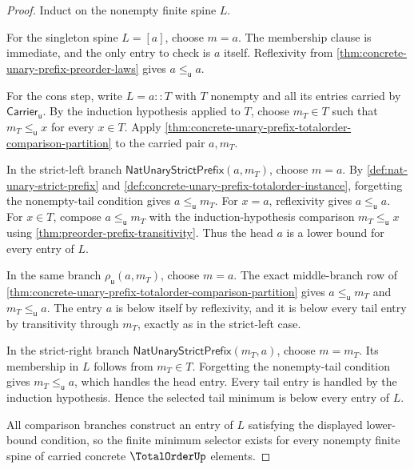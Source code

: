 \begin{proof}
Induct on the nonempty finite spine $L$.

For the singleton spine $L=[a]$, choose $m=a$. The membership clause is
immediate, and the only entry to check is $a$ itself. Reflexivity from
\autoref{thm:concrete-unary-prefix-preorder-laws} gives $a\le_{\mathsf{u}}a$.

For the cons step, write $L=a::T$ with $T$ nonempty and all its entries carried
by $\mathsf{Carrier}_{\mathsf{u}}$. By the induction hypothesis applied to
$T$, choose $m_T\in T$ such that $m_T\le_{\mathsf{u}}x$ for every $x\in T$.
Apply \autoref{thm:concrete-unary-prefix-totalorder-comparison-partition} to
the carried pair $a,m_T$.

In the strict-left branch $\mathsf{NatUnaryStrictPrefix}(a,m_T)$, choose
$m=a$. By \autoref{def:nat-unary-strict-prefix} and
\autoref{def:concrete-unary-prefix-totalorder-instance}, forgetting the
nonempty-tail condition gives $a\le_{\mathsf{u}}m_T$. For $x=a$, reflexivity
gives $a\le_{\mathsf{u}}a$. For $x\in T$, compose
$a\le_{\mathsf{u}}m_T$ with the induction-hypothesis comparison
$m_T\le_{\mathsf{u}}x$ using \autoref{thm:preorder-prefix-transitivity}. Thus
the head $a$ is a lower bound for every entry of $L$.

In the same branch $\rho_{\mathsf{u}}(a,m_T)$, choose $m=a$. The exact
middle-branch row of
\autoref{thm:concrete-unary-prefix-totalorder-comparison-partition} gives
$a\le_{\mathsf{u}}m_T$ and $m_T\le_{\mathsf{u}}a$. The entry $a$ is below
itself by reflexivity, and it is below every tail entry by transitivity through
$m_T$, exactly as in the strict-left case.

In the strict-right branch $\mathsf{NatUnaryStrictPrefix}(m_T,a)$, choose
$m=m_T$. Its membership in $L$ follows from $m_T\in T$. Forgetting the
nonempty-tail condition gives $m_T\le_{\mathsf{u}}a$, which handles the head
entry. Every tail entry is handled by the induction hypothesis. Hence the
selected tail minimum is below every entry of $L$.

All comparison branches construct an entry of $L$ satisfying the displayed
lower-bound condition, so the finite minimum selector exists for every nonempty
finite spine of carried concrete $\TotalOrderUp$ elements.
\end{proof}

